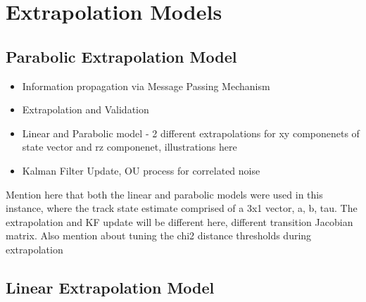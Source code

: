 




\section{Extrapolation Models}
\label{chapter-6-extrapolation}

\subsection{Parabolic Extrapolation Model}
\begin{itemize}
    \item Information propagation via Message Passing Mechanism
    \item Extrapolation and Validation
    \item Linear and Parabolic model - 2 different extrapolations for xy componenets of state vector and rz componenet, illustrations here
    \item Kalman Filter Update, OU process for correlated noise
\end{itemize}

Mention here that both the linear and parabolic models were used in this instance, where the track state estimate comprised of a 3x1 vector, a, b, tau. The extrapolation and KF update will be different here, different transition Jacobian matrix. Also mention about tuning the chi2 distance thresholds during extrapolation


\subsection{Linear Extrapolation Model}


